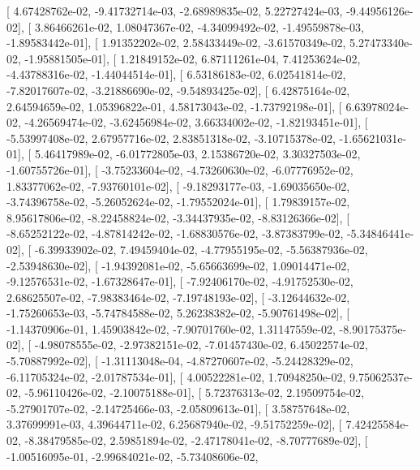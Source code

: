 \documentclass{article}
\begin{document}
       [  4.67428762e-02,  -9.41732714e-03,  -2.68989835e-02,
          5.22727424e-03,  -9.44956126e-02],
       [  3.86466261e-02,   1.08047367e-02,  -4.34099492e-02,
         -1.49559878e-03,  -1.89583442e-01],
       [  1.91352202e-02,   2.58433449e-02,  -3.61570349e-02,
          5.27473340e-02,  -1.95881505e-01],
       [  1.21849152e-02,   6.87111261e-04,   7.41253624e-02,
         -4.43788316e-02,  -1.44044514e-01],
       [  6.53186183e-02,   6.02541814e-02,  -7.82017607e-02,
         -3.21886690e-02,  -9.54893425e-02],
       [  6.42875164e-02,   2.64594659e-02,   1.05396822e-01,
          4.58173043e-02,  -1.73792198e-01],
       [  6.63978024e-02,  -4.26569474e-02,  -3.62456984e-02,
          3.66334002e-02,  -1.82193451e-01],
       [ -5.53997408e-02,   2.67957716e-02,   2.83851318e-02,
         -3.10715378e-02,  -1.65621031e-01],
       [  5.46417989e-02,  -6.01772805e-03,   2.15386720e-02,
          3.30327503e-02,  -1.60755726e-01],
       [ -3.75233604e-02,  -4.73260630e-02,  -6.07776952e-02,
          1.83377062e-02,  -7.93760101e-02],
       [ -9.18293177e-03,  -1.69035650e-02,  -3.74396758e-02,
         -5.26052624e-02,  -1.79552024e-01],
       [  1.79839157e-02,   8.95617806e-02,  -8.22458824e-02,
         -3.34437935e-02,  -8.83126366e-02],
       [ -8.65252122e-02,  -4.87814242e-02,  -1.68830576e-02,
         -3.87383799e-02,  -5.34846441e-02],
       [ -6.39933902e-02,   7.49459404e-02,  -4.77955195e-02,
         -5.56387936e-02,  -2.53948630e-02],
       [ -1.94392081e-02,  -5.65663699e-02,   1.09014471e-02,
         -9.12576531e-02,  -1.67328647e-01],
       [ -7.92406170e-02,  -4.91752530e-02,   2.68625507e-02,
         -7.98383464e-02,  -7.19748193e-02],
       [ -3.12644632e-02,  -1.75260653e-03,  -5.74784588e-02,
          5.26238382e-02,  -5.90761498e-02],
       [ -1.14370906e-01,   1.45903842e-02,  -7.90701760e-02,
          1.31147559e-02,  -8.90175375e-02],
       [ -4.98078555e-02,  -2.97382151e-02,  -7.01457430e-02,
          6.45022574e-02,  -5.70887992e-02],
       [ -1.31113048e-04,  -4.87270607e-02,  -5.24428329e-02,
         -6.11705324e-02,  -2.01787534e-01],
       [  4.00522281e-02,   1.70948250e-02,   9.75062537e-02,
         -5.96110426e-02,  -2.10075188e-01],
       [  5.72376313e-02,   2.19509754e-02,  -5.27901707e-02,
         -2.14725466e-03,  -2.05809613e-01],
       [  3.58757648e-02,   3.37699991e-03,   4.39644711e-02,
          6.25687940e-02,  -9.51752259e-02],
       [  7.42425584e-02,  -8.38479585e-02,   2.59851894e-02,
         -2.47178041e-02,  -8.70777689e-02],
       [ -1.00516095e-01,  -2.99684021e-02,  -5.73408606e-02,
\end{document}
